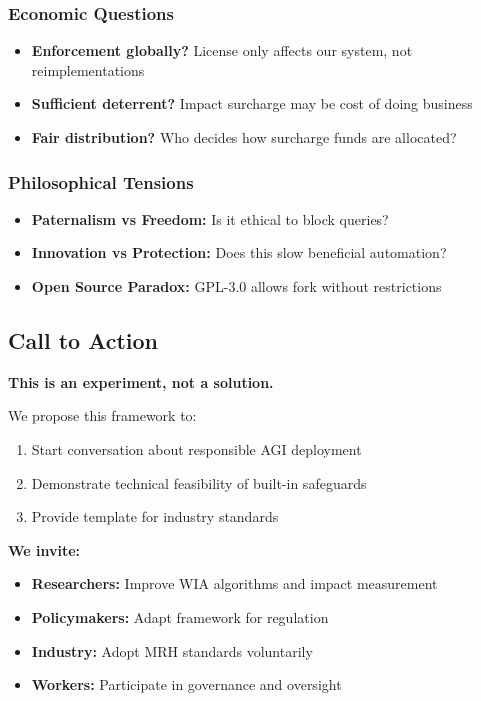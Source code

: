 \documentclass[11pt]{article}
\begin{document}
\subsubsection{Economic Questions}

\begin{itemize}
    \item \textbf{Enforcement globally?} License only affects our system, not reimplementations
    \item \textbf{Sufficient deterrent?} Impact surcharge may be cost of doing business
    \item \textbf{Fair distribution?} Who decides how surcharge funds are allocated?
\end{itemize}

\subsubsection{Philosophical Tensions}

\begin{itemize}
    \item \textbf{Paternalism vs Freedom:} Is it ethical to block queries?
    \item \textbf{Innovation vs Protection:} Does this slow beneficial automation?
    \item \textbf{Open Source Paradox:} GPL-3.0 allows fork without restrictions
\end{itemize}

\subsection{Call to Action}

\textbf{This is an experiment, not a solution.}

We propose this framework to:
\begin{enumerate}
    \item Start conversation about responsible AGI deployment
    \item Demonstrate technical feasibility of built-in safeguards
    \item Provide template for industry standards
\end{enumerate}

\textbf{We invite:}
\begin{itemize}
    \item \textbf{Researchers:} Improve WIA algorithms and impact measurement
    \item \textbf{Policymakers:} Adapt framework for regulation
    \item \textbf{Industry:} Adopt MRH standards voluntarily
    \item \textbf{Workers:} Participate in governance and oversight
\end{itemize}
\end{document}
